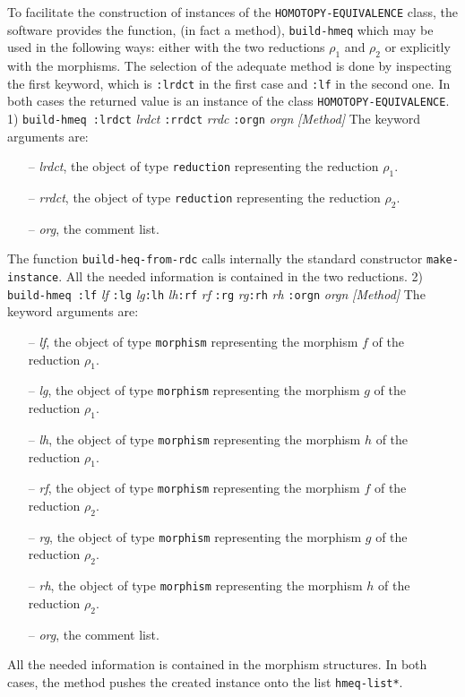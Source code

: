 To facilitate the construction of instances of the
{\tt HOMOTOPY-EQUIVALENCE} class, the software provides the function, (in fact a method),  {\tt build-hmeq} 
which may be used in the following ways:
either with the two reductions $\rho_1$ and $\rho_2$ or explicitly with the morphisms.
The selection of the adequate method is done by inspecting the first keyword, which is 
{\tt :lrdct} in the first case and {\tt :lf} in the second one. In both cases
the returned value is an instance of the class {\tt HOMOTOPY-EQUIVALENCE}. 
\vskip 0.35cm
1) {\tt build-hmeq :lrdct} {\em lrdct} {\tt :rrdct} {\em rrdc} {\tt :orgn} {\em orgn} \hfill {\em [Method]}
\vskip 0.35cm
The keyword arguments are:
\begin{itemize}
\item[--] {\em lrdct}, the object of type {\tt reduction}  representing the reduction $\rho_1$.
\item[--] {\em rrdct}, the object of type {\tt reduction}  representing the reduction $\rho_2$.
\item[--] {\em org}, the comment list.
\end{itemize}
The function {\tt build-heq-from-rdc} calls internally the standard constructor {\tt make-instance}.
All the needed information is contained in the two reductions.
\vskip 0.35cm
2) {\tt build-hmeq :lf} {\em lf} {\tt :lg} {\em lg}{\tt :lh} {\em lh}{\tt :rf} {\em rf}
                             {\tt :rg} {\em rg}{\tt :rh} {\em rh} {\tt :orgn} {\em orgn} \hfill {\em [Method]}
\vskip 0.35cm
The keyword arguments are:
\begin{itemize}
\item[--] {\em lf}, the  object of type {\tt morphism}  representing the morphism $f$ of the reduction $\rho_1$.
\item[--] {\em lg}, the  object of type {\tt morphism}  representing the morphism $g$ of the reduction $\rho_1$.
\item[--] {\em lh}, the object of type  {\tt morphism}  representing the morphism $h$ of the reduction $\rho_1$.
\item[--] {\em rf}, the object of type {\tt morphism}   representing the morphism $f$ of the reduction $\rho_2$.
\item[--] {\em rg}, the object of type {\tt morphism}   representing the morphism $g$ of the reduction $\rho_2$.
\item[--] {\em rh}, the object of type {\tt morphism}   representing the morphism $h$ of the reduction $\rho_2$.
\item[--] {\em org}, the comment list.
\end{itemize}
All the needed information is contained in the morphism structures.
In both cases, the method  pushes the created instance onto the list {\tt *hmeq-list*}.

